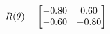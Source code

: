 \documentclass[preview]{standalone}
\begin{document}
\begin{align*}
\special{dvisvgm:raw <g id='unique000'>}R(\theta) = \begin{bmatrix}-0.80 & 0.60\\-0.60 & -0.80\end{bmatrix}\special{dvisvgm:raw </g>}
\end{align*}
\end{document}
